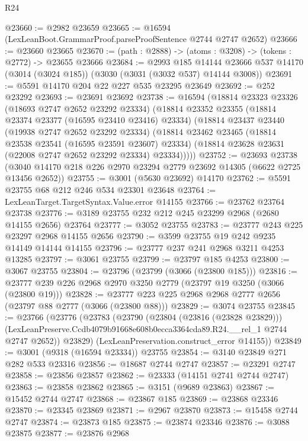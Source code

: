 \begin{lexlean}{R24}
\begin{coremodule}
@23660 := @2982 @23659
@23665 := @16594 (LexLeanBoot.GrammarProof.parseProofSentence @2744 @2747 @2652)
@23666 := @23660 @23665
@23670 := (path : @2888) -> (atoms : @3208) -> (tokens : @2772) -> @23655 @23666
@23684 := @2993
    @185
    @14144
    @23666
    @537
    @14170
    (@3014 (@3024 @185))
    (@3030 (@3031 (@3032 @537) @14144 @3008))
@23691 := @5591 @14170 @204 @22 @227 @535 @23295 @23649
@23692 := @252 @23292
@23693 := @23691 @23692
@23738 := @16594
    (@18814
      @23323
      @23326
      (@18693 @2747 @2652 @23292 @23334)
      (@18814
        @23352
        @23355
        (@18814 @23374 @23377 (@16595 @23410 @23416) @23334)
        (@18814
          @23437
          @23440
          (@19938 @2747 @2652 @23292 @23334)
          (@18814
            @23462
            @23465
            (@18814 @23538 @23541 (@16595 @23591 @23607) @23334)
            (@18814 @23628 @23631 (@22008 @2747 @2652 @23292 @23334) @23334)))))
@23752 := @23693
    @23738
    (@3040 @14170 @218 @226 @2970 @23294 @2779 @23692 @14305 (@6622 @2725 @13456 @2652))
@23755 := @3001 (@5630 @23692) @14170
@23762 := @5591 @23755 @68 @212 @246 @534 @23301 @23648
@23764 := LexLeanTarget.TargetSyntax.Value.error @14155
@23766 := @23762 @23764 @23738
@23776 := @3189 @23755 @232 @212 @245 @23299 @2968 (@2680 @14155 @2656) @23764
@23777 := @3052 @23755
@23783 := @23777 @243 @225 @23297 @2968 @14155 @2656
@23790 := @3599 @23755 @19 @242 @9235 @14149 @14144 @14155
@23796 := @23777 @237 @241 @2968 @3211 @4253 @13285
@23797 := @3061 @23755
@23799 := @23797 @185 @4253
@23800 := @3067 @23755
@23804 := @23796 (@23799 (@3066 (@23800 @185)))
@23816 := @23777 @239 @226 @2968 @2970 @3250 @2779 (@23797 @19 @3250 (@3066 (@23800 @19)))
@23828 := @23777 @223 @225 @2968 @2968 @2777 @2656 (@23797 @88 @2777 (@3066 (@23800 @88)))
@23829 := @3074 @23755
@23845 := @23766
    (@23776
      (@23783
        (@23790
          (@23804 (@23816 (@23828 @23829)))
          (LexLeanPreserve.Ccdb4079b91668e608b0ecca3364cda89.R24.__rel_1 @2744 @2747 @2652))
        @23829)
      (LexLeanPreservation.construct_error @14155))
@23849 := @3001 (@9318 (@16594 @23334)) @23755
@23854 := @3140 @23849 @271 @282 @533 @23316
@23856 := @18687 @2744 @2747
@23857 := @23291 @2747
@23858 := @23856 @23857
@23862 := @23333 (@14151 @2741 @2744 @2747)
@23863 := @23858 @23862
@23865 := @3151 (@9689 @23863)
@23867 := @15452 @2744 @2747
@23868 := @23867 @185
@23869 := @23868 @23346
@23870 := @23345 @23869
@23871 := @2967 @23870
@23873 := @15458 @2744 @2747
@23874 := @23873 @185
@23875 := @23874 @23346
@23876 := @3088 @23875
@23877 := @23876 @2968

\end{coremodule}
\end{lexlean}
